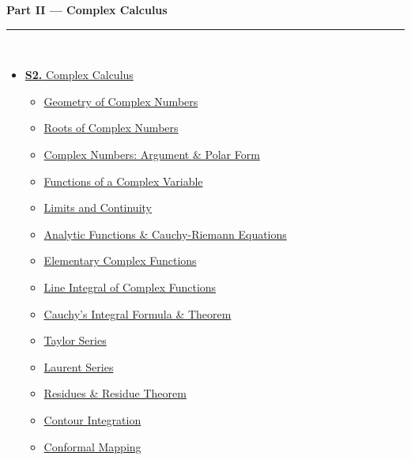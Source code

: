 \documentclass[12pt,a3paper]{article}
\begin{document}
\begin{tcolorbox}[breakable,colback=cE!5,colframe=cE,boxrule=1pt,arc=5pt,
  left=8pt,right=8pt,top=8pt,bottom=8pt,before skip=4pt]
  {\large\bfseries\textcolor{cE}{Part II --- Complex Calculus}}\\[5pt]
  \textcolor{cE!40}{\rule{\textwidth}{0.4pt}}\\[3pt]
  \small\begin{itemize}[leftmargin=1.2em,itemsep=1pt,label={\textcolor{cE}{$\triangleright$}}]
    \item \hyperref[sec:S5]{\textbf{S2.} Complex Calculus}
      \begin{itemize}[leftmargin=1.5em,itemsep=0pt,label={\textcolor{cE}{$\cdot$}}]
        \item \hyperref[sub:s5-geometry]{Geometry of Complex Numbers}
        \item \hyperref[sub:s5-roots]{Roots of Complex Numbers}
        \item \hyperref[sub:s5-complexnums]{Complex Numbers: Argument \& Polar Form}
        \item \hyperref[sub:s5-functions]{Functions of a Complex Variable}
        \item \hyperref[sub:s5-limcont]{Limits and Continuity}
        \item \hyperref[sub:s5-analytic]{Analytic Functions \& Cauchy-Riemann Equations}
        \item \hyperref[sub:s5-elementary]{Elementary Complex Functions}
        \item \hyperref[sub:s5-lineint]{Line Integral of Complex Functions}
        \item \hyperref[sub:s5-cauchy]{Cauchy's Integral Formula \& Theorem}
        \item \hyperref[sub:s5-taylor]{Taylor Series}
        \item \hyperref[sub:s5-laurent]{Laurent Series}
        \item \hyperref[sub:s5-residue]{Residues \& Residue Theorem}
        \item \hyperref[sub:s5-contour]{Contour Integration}
        \item \hyperref[sub:s5-conformal]{Conformal Mapping}
      \end{itemize}
  \end{itemize}
\end{tcolorbox}

\vspace{6pt}
\end{document}

